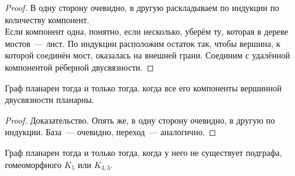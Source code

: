 \documentclass{article}
\begin{document}
    \begin{proof}
        В одну сторону очевидно, в другую раскладываем по индукции по количеству компонент.\\
        Если компонент одна, понятно, если несколько, уберём ту, которая в дереве мостов~--- лист. По индукции расположим остаток так, чтобы вершина, к которой соединён мост, оказалась на внешней грани. Соединим с удалённой компонентой рёберной двусвязности.
    \end{proof}
    \begin{lemma}
        \label{lmm:Граф планарен тогда и только тогда, когда все его компоненты вершинной двусвязности планарны.}
        Граф планарен тогда и только тогда, когда все его компоненты вершинной двусвязности планарны.
    \end{lemma}
    \begin{proof}
        Доказательство. Опять же, в одну сторону очевидно, в другую по индукции. База~--- очевидно, переход~--- аналогично.
    \end{proof}
    \begin{theorem}
        Граф планарен тогда и только тогда, когда у него не существует подграфа, гомеоморфного $K_5$ или $K_{3,3}$.
    \end{theorem}
\end{document}

